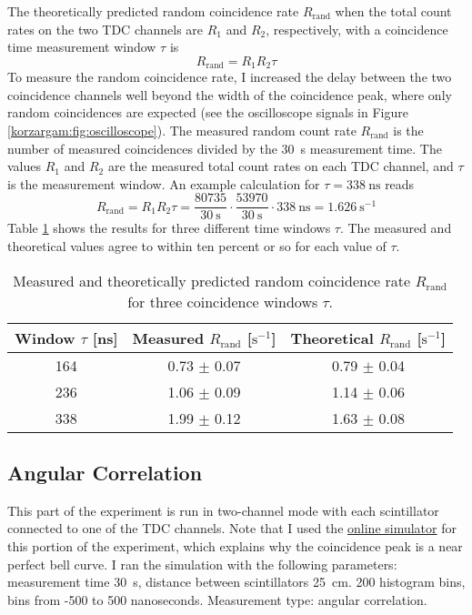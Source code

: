 \documentclass[11pt, a4paper]{article}
\begin{document}
The theoretically predicted random coincidence rate $ R_{\text{rand}} $ when the total count rates on the two TDC channels are $ R_{1} $ and $ R_{2} $, respectively, with a coincidence time measurement window $ \tau $ is
\begin{equation*}
	R_{\text{rand}} = R_{1}R_{2}\tau
\end{equation*}
To measure the random coincidence rate, I increased the delay between the two coincidence channels well beyond the width of the coincidence peak, where only random coincidences are expected (see the oscilloscope signals in Figure \ref{korzargam:fig:oscilloscope}). The measured random count rate $ R_{\text{rand}} $ is the number of measured coincidences divided by the \SI{30}{\second} measurement time. The values $ R_{1} $ and $ R_{2} $ are the measured total count rates on each TDC channel, and $ \tau $ is the measurement window. An example calculation for $ \tau = \SI{338}{\nano \second} $ reads
\begin{equation*}
	R_{\text{rand}} =  R_{1}R_{2}\tau = \frac{80735}{\SI{30}{\second}} \cdot \frac{53970}{\SI{30}{\second}} \cdot \SI{338}{\nano \second} = \SI{1.626}{\second^{-1}}
\end{equation*}
Table \ref{korzargam:table:random} shows the results for three different time windows $ \tau $. The measured and theoretical values agree to within ten percent or so for each value of $ \tau $. 
\begin{table}
\centering
\begin{tabular}{c|c|c}
	Window $ \tau $ [\si{\nano \second}]& Measured $ R_{\text{rand}} $ [$ \si{\second}^{-1} $] & Theoretical $ R_{\text{rand}} $ [$ \si{\second}^{-1} $]\\
	\hline 
	164 & 0.73 $ \pm $ 0.07 & 0.79 $ \pm $ 0.04\\
	236 & 1.06 $ \pm $ 0.09 & 1.14 $ \pm $ 0.06\\
	338 & 1.99 $ \pm $ 0.12 & 1.63 $ \pm $ 0.08
\end{tabular}
\caption{Measured and theoretically predicted random coincidence rate $ R_{\text{rand}} $ for three coincidence windows $ \tau $. }
\label{korzargam:table:random}
\end{table}



\subsection{Angular Correlation} \label{korzargam:ss:ang-cor}
This part of the experiment is run in two-channel mode with each scintillator connected to one of the TDC channels. Note that I used the \href{https://belle2.ijs.si/fmf2020/gamagama/}{online simulator} for this portion of the experiment, which explains why the coincidence peak is a near perfect bell curve. I ran the simulation with the following parameters: measurement time \SI{30}{\second}, distance between scintillators \SI{25}{\centi \meter}. 200 histogram bins, bins from -500 to 500 nanoseconds. Measurement type: angular correlation.
\end{document}

